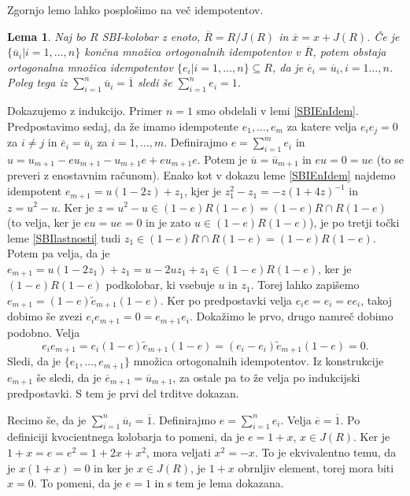 \documentclass[a4paper, 12pt]{amsart}
\theoremstyle{definition} %
\theoremstyle{plain} %
\newtheorem{lema}[definicija]{Lema}
\begin{document}
Zgornjo lemo lahko posplošimo na več idempotentov.

\begin{lema}
\label{SBInIdem}
Naj bo $R$ SBI-kolobar z enoto, $\overline{R} = R/J(R)$ in $\overline{x} = x + J(R)$. Če je $\{\overline{u}_i|i=1,\dots,n\}$ končna množica ortogonalnih idempotentov v $\overline{R}$, potem obstaja ortogonalna množica idempotentov $\{e_i|i=1,\dots,n\} \subseteq R$, da je $\overline{e}_i = \overline{u}_i, i =1\dots,n$. Poleg tega iz $\sum_{i=1}^n \overline{u}_i = \overline{1}$ sledi še $\sum_{i=1}^n e_i =1$. 
\end{lema}

\proof
Dokazujemo z indukcijo. Primer $n=1$ smo obdelali v lemi \ref{SBIEnIdem}. Predpostavimo sedaj, da že imamo idempotente $e_1,\dots,e_m$ za katere velja $e_i e_j = 0$ za $ i \neq j$ in $\overline{e}_i = \overline{u}_i$ za $i=1,\dots,m$. Definirajmo $e=\sum_{i=1}^m e_i$ in $u = u_{m+1} - eu_{m+1} - u_{m+1}e + eu_{m+1}e$. Potem je $\overline{u} = \overline{u}_{m+1}$ in $eu = 0 = ue$ (to se preveri z enostavnim računom). Enako kot v dokazu leme  \ref{SBIEnIdem} najdemo idempotent $e_{m+1} = u(1-2z) + z_1$, kjer je $z_1^2 - z_1 = -z(1+4z)^{-1}$ in $z = u^2 - u$. Ker je $z=u^2 - u\in (1-e) R(1-e) = (1-e)R\cap R(1-e)$ (to velja, ker je $eu=ue=0$ in je zato $u\in (1-e)R(1-e)$), je po tretji točki leme \ref{SBIlastnosti} tudi $z_1 \in (1-e) R\cap R(1-e) = (1-e)R(1-e)$. Potem pa velja, da je $e_{m+1} = u(1-2z_1) + z_1 = u - 2 uz_1 + z_1\in (1-e)R(1-e)$, ker je $(1-e)R(1-e)$ podkolobar, ki vsebuje $u$ in $z_1$. Torej lahko zapišemo $e_{m+1} = (1-e)\tilde{e}_{m+1}(1-e)$. Ker po predpostavki velja $e_i e =  e_i = e e_i$, takoj dobimo še zvezi $e_i e_{m+1} = 0 =e_{m+1} e_i$. Dokažimo le prvo, drugo namreč dobimo podobno. Velja
$$
e_i e_{m+1} = e_i (1-e) \tilde{e}_{m+1} (1-e) = (e_i - e_i) \tilde{e}_{m+1}(1-e) = 0.
$$
Sledi, da je $\{e_1, \dots, e_{m+1}\}$ množica ortogonalnih idempotentov. Iz konstrukcije $e_{m+1}$ še sledi, da je $\overline{e}_{m+1} =  \overline{u}_{m+1}$, za ostale pa to že velja po indukcijski predpostavki. S tem je prvi del trditve dokazan. 

Recimo še, da je $\sum_{i=1}^n \overline{u}_i = \overline{1}$. Definirajmo $e= \sum_{i=1}^n e_i$. Velja $\overline{e} = \overline{1}$. Po definiciji kvocientnega kolobarja to pomeni, da je $e = 1+x$, $x\in J(R)$. Ker je $1+x=e=e^2 = 1+ 2x + x^2$, mora veljati $x^2 = -x$. To je ekvivalentno temu, da je 
$x(1+x) = 0$ in ker je $x\in J(R)$, je $1+x$ obrnljiv element, torej mora biti $x=0$. To pomeni, da je $e=1$ in s tem je lema dokazana.
\endproof
\end{document}
